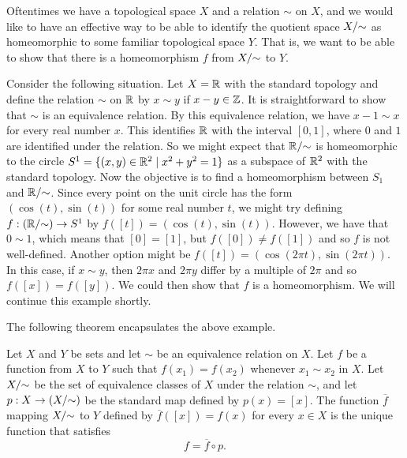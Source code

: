 Oftentimes we have a topological space $X$ and a relation $\sim$ on $X$, and we would like to have an effective way to be able to identify the quotient space $X/\hspace{-1mm}\sim$ as homeomorphic to some familiar topological space $Y$. That is, we want to be able to show that there is a homeomorphism $f$ from $X/\hspace{-1mm}\sim$ to $Y$. 

\begin{example} \label{exp:R_Z_quotient} Consider the following situation. Let $X = \mathbb{R}$ with the standard topology and define the relation $\sim$ on $\mathbb{R}$ by $x \sim y$ if $x - y \in \mathbb{Z}$. It is straightforward to show that $\sim$ is an equivalence relation. By this equivalence relation, we have $x-1 \sim x$ for every real number $x$. This identifies $\mathbb{R}$ with the interval $[0,1]$, where $0$ and $1$ are identified under the relation. So we might expect that $\mathbb{R}/\hspace{-1mm}\sim$ is homeomorphic to the circle $S^1 = \{(x,y) \in \mathbb{R}^2 \mid x^2+y^2 = 1\}$ as a subspace of $\mathbb{R}^2$ with the standard topology. Now the objective is to find a homeomorphism between $S_1$ and $\mathbb{R}/\hspace{-1mm}\sim$. Since every point on the unit circle has the form $(\cos(t), \sin(t))$ for some real number $t$, we might try defining $f: (\mathbb{R}/\hspace{-1mm}\sim) \to S^1$ by $f([t]) = (\cos(t), \sin(t))$. However, we have that $0 \sim 1$, which means that $[0] = [1]$, but $f([0]) \neq f([1])$ and so $f$ is not well-defined. Another option might be $f([t]) = (\cos(2 \pi t), \sin(2 \pi t))$. In this case, if $x \sim y$, then $2 \pi x$ and $2 \pi y$ differ by a multiple of $2 \pi$ and so $f([x]) = f([y])$. We could then show that $f$ is a homeomorphism. We will continue this example shortly.

\end{example}

The following theorem encapsulates the above example.

\begin{theorem} \label{thm:quotient_1} Let $X$ and $Y$ be sets and let $\sim$ be an equivalence relation on $X$. Let $f$ be a function from $X$ to $Y$ such that $f(x_1) = f(x_2)$ whenever $x_1 \sim x_2$ in $X$. Let $X/\hspace{-1mm}\sim$ be the set of equivalence classes of $X$ under the relation $\sim$, and let $p: X \to (X/\hspace{-1mm}\sim)$ be the standard map defined by $p(x) = [x]$.  The function $\overline{f}$ mapping $X/\hspace{-1mm}\sim$ to $Y$ defined by $\overline{f}([x]) = f(x)$ for every $x \in X$ is the unique function that satisfies 
\[f = \overline{f} \circ p.\]
\end{theorem}


